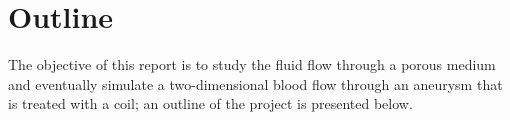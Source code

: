 \documentclass[a4paper, 11pt]{report}
\begin{document}


\newpage
\section{Outline}
The objective of this report is to study the fluid flow through a porous medium and eventually simulate a two-dimensional blood flow through an aneurysm that is treated with a coil; an outline of the project is presented below.

\end{document}
